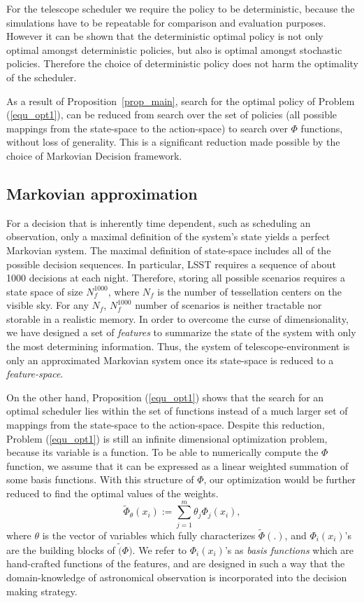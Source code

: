 \documentclass[12pt]{aastex62}
\theoremstyle{definition}
\begin{document}
For the telescope scheduler we require the policy to be deterministic, because the simulations have to be repeatable for comparison and evaluation purposes. However it can be shown that the deterministic optimal policy is not only optimal amongst deterministic policies, but also is optimal amongst stochastic policies. Therefore the choice of deterministic policy does not harm the optimality of the scheduler. 

As a result of Proposition~\ref{prop_main}, search for the optimal policy of Problem (\ref{equ_opt1}), can be reduced from search over the set of policies (all possible mappings from the state-space to the action-space) to search over $\Phi$ functions, without loss of generality. This is a significant reduction made possible by the choice of Markovian Decision framework.

\subsection{Markovian approximation}\label{sec_Markov_approx}
For a decision that is inherently time dependent, such as scheduling an observation, only a maximal definition of the system's state yields a perfect Markovian system. The maximal definition of state-space includes all of the possible decision sequences. In particular, LSST requires a sequence of about 1000 decisions at each night. Therefore, storing all possible scenarios requires a state space of size $N_{f}^{1000}$, where $N_f$ is the number of tessellation centers on the visible sky. For any $N_f$, $N_{f}^{1000}$ number of scenarios is neither tractable nor storable in a realistic memory. In order to overcome the curse of dimensionality, we have designed a set of \textit{features} to summarize the state of the system with only the most determining information. Thus, the system of telescope-environment is only an approximated Markovian system once its state-space is reduced to a \textit{feature-space}. 

On the other hand, Proposition (\ref{equ_opt1}) shows that the search for an optimal scheduler lies within the set of functions instead of a much larger set of mappings from the state-space to the action-space. Despite this reduction, Problem (\ref{equ_opt1}) is still an infinite dimensional optimization problem, because its variable is a function. To be able to numerically compute the $\Phi$ function, we assume that it can be expressed as a linear weighted summation of some basis functions. With this structure of $\Phi$, our optimization would be further reduced to find the optimal values of the weights.
%
\begin{equation*}
 \tilde{\Phi}_{\theta}({x}_{i}) := \sum_{j=1}^m \theta_j \Phi_j(x_{i}),
\end{equation*}
%
where $\theta$ is the vector of variables which fully characterizes $\tilde{\Phi}(.)$, and $\Phi_i(x_i)$'s are the building blocks of $\tilde(\Phi)$. We refer to  $\Phi_i(x_i)$'s as \textit{basis functions} which are hand-crafted functions of the features, and are designed in such a way that the domain-knowledge of astronomical observation is incorporated into the decision making strategy.
\end{document}
